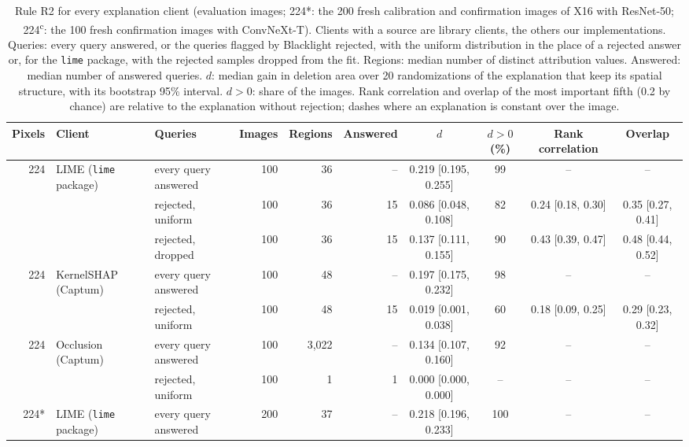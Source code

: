 \begin{table}
\centering\footnotesize\setlength{\tabcolsep}{3pt}
\caption{Rule R2 for every explanation client (evaluation images; 224*: the 200 fresh calibration and confirmation images of X16 with ResNet-50; 224\textsuperscript{c}: the 100 fresh confirmation images with ConvNeXt-T). Clients with a source are library clients, the others our implementations. Queries: every query answered, or the queries flagged by Blacklight rejected, with the uniform distribution in the place of a rejected answer or, for the \texttt{lime} package, with the rejected samples dropped from the fit. Regions: median number of distinct attribution values. Answered: median number of answered queries. $d$: median gain in deletion area over 20 randomizations of the explanation that keep its spatial structure, with its bootstrap 95\% interval. $d>0$: share of the images. Rank correlation and overlap of the most important fifth (0.2 by chance) are relative to the explanation without rejection; dashes where an explanation is constant over the image.}
\label{tab:validity}
\vspace{3pt}
\begin{adjustbox}{max width=\textheight}
\begin{tabular}{rllrrrcccc}
\toprule
Pixels & Client & Queries & Images & Regions & Answered & $d$ & $d>0$ (\%) & Rank correlation & Overlap \\
\midrule
224 & LIME (\texttt{lime} package) & every query answered & 100 & 36 & -- & 0.219 {[}0.195, 0.255{]} & 99 & -- & -- \\
 &  & rejected, uniform & 100 & 36 & 15 & 0.086 {[}0.048, 0.108{]} & 82 & 0.24 {[}0.18, 0.30{]} & 0.35 {[}0.27, 0.41{]} \\
 &  & rejected, dropped & 100 & 36 & 15 & 0.137 {[}0.111, 0.155{]} & 90 & 0.43 {[}0.39, 0.47{]} & 0.48 {[}0.44, 0.52{]} \\
224 & KernelSHAP (Captum) & every query answered & 100 & 48 & -- & 0.197 {[}0.175, 0.232{]} & 98 & -- & -- \\
 &  & rejected, uniform & 100 & 48 & 15 & 0.019 {[}0.001, 0.038{]} & 60 & 0.18 {[}0.09, 0.25{]} & 0.29 {[}0.23, 0.32{]} \\
224 & Occlusion (Captum) & every query answered & 100 & 3{,}022 & -- & 0.134 {[}0.107, 0.160{]} & 92 & -- & -- \\
 &  & rejected, uniform & 100 & 1 & 1 & 0.000 {[}0.000, 0.000{]} & -- & -- & -- \\[2pt]
224* & LIME (\texttt{lime} package) & every query answered & 200 & 37 & -- & 0.218 {[}0.196, 0.233{]} & 100 & -- & -- \\

\end{tabular}
\end{adjustbox}
\end{table}
